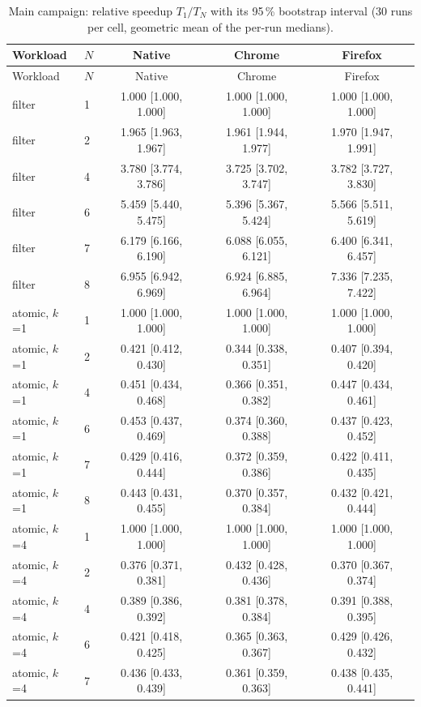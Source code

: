 {\small
\begin{longtable}{llccc}
\caption{Main campaign: relative speedup $T_1/T_N$ with its 95\,\% bootstrap interval (30 runs per cell, geometric mean of the per-run medians).}\label{tab:speedup} \\
\toprule
Workload & $N$ & Native & Chrome & Firefox \\
\midrule
\endfirsthead
\toprule
Workload & $N$ & Native & Chrome & Firefox \\
\midrule
\endhead
\bottomrule
\endfoot
filter & 1 & 1.000 [1.000, 1.000] & 1.000 [1.000, 1.000] & 1.000 [1.000, 1.000] \\
filter & 2 & 1.965 [1.963, 1.967] & 1.961 [1.944, 1.977] & 1.970 [1.947, 1.991] \\
filter & 4 & 3.780 [3.774, 3.786] & 3.725 [3.702, 3.747] & 3.782 [3.727, 3.830] \\
filter & 6 & 5.459 [5.440, 5.475] & 5.396 [5.367, 5.424] & 5.566 [5.511, 5.619] \\
filter & 7 & 6.179 [6.166, 6.190] & 6.088 [6.055, 6.121] & 6.400 [6.341, 6.457] \\
filter & 8 & 6.955 [6.942, 6.969] & 6.924 [6.885, 6.964] & 7.336 [7.235, 7.422] \\
\midrule
atomic, $k$=1 & 1 & 1.000 [1.000, 1.000] & 1.000 [1.000, 1.000] & 1.000 [1.000, 1.000] \\
atomic, $k$=1 & 2 & 0.421 [0.412, 0.430] & 0.344 [0.338, 0.351] & 0.407 [0.394, 0.420] \\
atomic, $k$=1 & 4 & 0.451 [0.434, 0.468] & 0.366 [0.351, 0.382] & 0.447 [0.434, 0.461] \\
atomic, $k$=1 & 6 & 0.453 [0.437, 0.469] & 0.374 [0.360, 0.388] & 0.437 [0.423, 0.452] \\
atomic, $k$=1 & 7 & 0.429 [0.416, 0.444] & 0.372 [0.359, 0.386] & 0.422 [0.411, 0.435] \\
atomic, $k$=1 & 8 & 0.443 [0.431, 0.455] & 0.370 [0.357, 0.384] & 0.432 [0.421, 0.444] \\
\midrule
atomic, $k$=4 & 1 & 1.000 [1.000, 1.000] & 1.000 [1.000, 1.000] & 1.000 [1.000, 1.000] \\
atomic, $k$=4 & 2 & 0.376 [0.371, 0.381] & 0.432 [0.428, 0.436] & 0.370 [0.367, 0.374] \\
atomic, $k$=4 & 4 & 0.389 [0.386, 0.392] & 0.381 [0.378, 0.384] & 0.391 [0.388, 0.395] \\
atomic, $k$=4 & 6 & 0.421 [0.418, 0.425] & 0.365 [0.363, 0.367] & 0.429 [0.426, 0.432] \\
atomic, $k$=4 & 7 & 0.436 [0.433, 0.439] & 0.361 [0.359, 0.363] & 0.438 [0.435, 0.441] \\

\end{longtable}}

